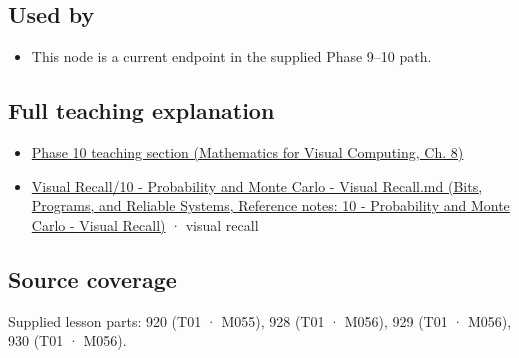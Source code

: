 \subsection{Used by}\label{appendix-f0437ea55a47-used-by}

\begin{itemize}
\tightlist
\item
  This node is a current endpoint in the supplied Phase 9--10 path.
\end{itemize}

\subsection{Full teaching explanation}\label{appendix-f0437ea55a47-full-teaching-explanation}

\begin{itemize}
\tightlist
\item
  \href{../02-Mathematics-for-Visual-Computing/main.pdf\#nameddest=02-foundations-ii-ch024-waiting-times-event-counts-and-covariance-geometry}{Phase 10 teaching section (Mathematics for Visual Computing, Ch. 8)}
\item
  \href{../01-Bits-Programs-and-Reliable-Systems/main.pdf\#nameddest=appendix-cb5af353ef77}{Visual Recall/10 - Probability and Monte Carlo - Visual Recall.md (Bits, Programs, and Reliable Systems, Reference notes: 10 - Probability and Monte Carlo - Visual Recall)} · visual recall
\end{itemize}

\subsection{Source coverage}\label{appendix-f0437ea55a47-source-coverage}

Supplied lesson parts: 920 (T01 · M055), 928 (T01 · M056), 929 (T01 · M056), 930 (T01 · M056).
